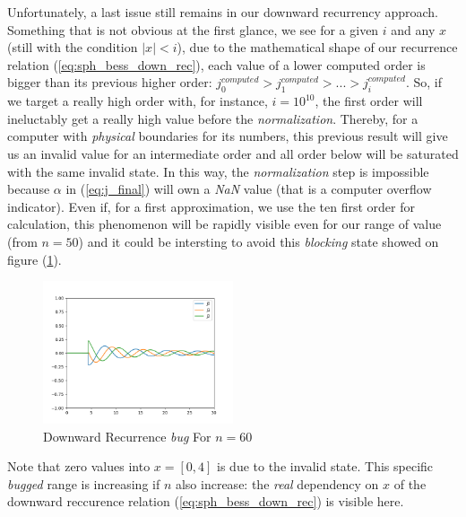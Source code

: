 \documentclass{article}
\numberwithin{equation}{section}
\begin{document}
Unfortunately, a last issue still remains in our downward recurrency approach. Something that is not obvious at the first glance, we see for a given $i$ and any $x$ (still with the condition $|x| < i$), due to the mathematical shape of our recurrence relation (\ref{eq:sph_bess_down_rec}), each value of a lower computed order is bigger than its previous higher order: $j^{computed}_{0} > j^{computed}_{1} > ... > j^{computed}_{i}$. So, if we target a really high order with, for instance, $i=10^{10}$, the first order will ineluctably get a really high value before the \textit{normalization}. Thereby, for a computer with \textit{physical} boundaries for its numbers, this previous result will give us an invalid value for an intermediate order and all order below will be saturated with the same invalid state. In this way, the \textit{normalization} step is impossible because $\alpha$ in (\ref{eq:j_final}) will own a \textit{NaN} value (that is a computer overflow indicator). Even if, for a first approximation, we use the ten first order for calculation, this phenomenon will be rapidly visible even for our range of value (from $n=50$) and it could be intersting to avoid this \textit{blocking} state showed on figure (\ref{fig:jn_bug}).
\begin{figure}[h!]
    \centering
    \includegraphics[width=0.5\textwidth, height=0.5\textwidth]{jn_bug.png}
    \caption{Downward Recurrence \textit{bug} For $n=60$}
    \label{fig:jn_bug}
\end{figure}
Note that zero values into $x = [0, 4]$ is due to the invalid state. This specific \textit{bugged} range is increasing if $n$ also increase: the \textit{real} dependency on $x$ of the downward reccurence relation (\ref{eq:sph_bess_down_rec}) is visible here.
\end{document}
